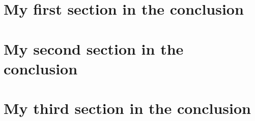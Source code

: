 
\section{My first section in the conclusion}%
\label{sec:my_first_section_in_the_conclusion}
\lipsum[1]

\section{My second section in the conclusion}%
\label{sec:my_second_section_in_the_conclusion}
\lipsum[2-4]

\section{My third section in the conclusion}%
\label{sec:my_third_section_in_the_conclusion}
\lipsum[2-4]

